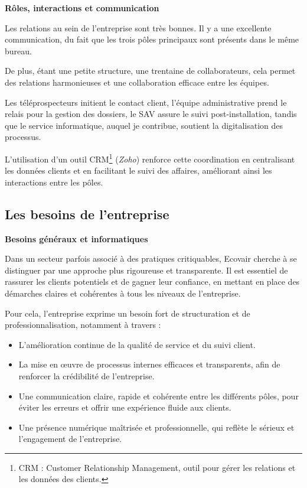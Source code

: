 \textbf{Rôles, interactions et communication}\vspace{0.3cm}

Les relations au sein de l’entreprise sont très bonnes. Il y a une excellente communication, du fait que les trois pôles principaux sont présents dans le même bureau.

De plus, étant une petite structure, une trentaine de collaborateurs, cela permet des relations harmonieuses et une collaboration efficace entre les équipes.

Les téléprospecteurs initient le contact client, l’équipe administrative prend le relais pour la gestion des dossiers, le SAV assure le suivi post-installation, tandis que le service informatique, auquel je contribue, soutient la digitalisation des processus.

L’utilisation d’un outil CRM\footnote{CRM : Customer Relationship Management, outil pour gérer les relations et les données des clients.} (\textit{Zoho}) renforce cette coordination en centralisant les données clients et en facilitant le suivi des affaires, améliorant ainsi les interactions entre les pôles.

\subsection{Les besoins de l’entreprise}

\textbf{Besoins généraux et informatiques}\vspace{0.3cm}

Dans un secteur parfois associé à des pratiques critiquables, Ecovair cherche à se distinguer par une approche plus rigoureuse et transparente. Il est essentiel de rassurer les clients potentiels et de gagner leur confiance, en mettant en place des démarches claires et cohérentes à tous les niveaux de l’entreprise.

Pour cela, l’entreprise exprime un besoin fort de structuration et de professionnalisation, notamment à travers :\vspace{0.3cm}

\begin{itemize}
    \item L’amélioration continue de la qualité de service et du suivi client.\vspace{0.3cm}
    \item La mise en œuvre de processus internes efficaces et transparents, afin de renforcer la crédibilité de l’entreprise.\vspace{0.3cm}
    \item Une communication claire, rapide et cohérente entre les différents pôles, pour éviter les erreurs et offrir une expérience fluide aux clients.\vspace{0.3cm}
    \item Une présence numérique maîtrisée et professionnelle, qui reflète le sérieux et l’engagement de l’entreprise.\vspace{0.3cm}
\end{itemize}

